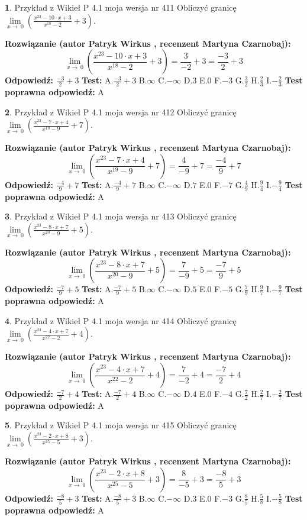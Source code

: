 \documentclass[12pt, a4paper]{article}
\theoremstyle{definition} %
\newtheorem{zad}{}
\newcommand{\zadStart}[1]{\begin{zad}#1\newline}
\newcommand{\zadStop}{\end{zad}}
\newcommand{\rozwStart}[2]{\noindent \textbf{Rozwiązanie (autor #1 , recenzent #2): }\newline}
\newcommand{\rozwStop}{\newline}
\newcommand{\odpStart}{\noindent \textbf{Odpowiedź:}\newline}
\newcommand{\odpStop}{\newline}
\newcommand{\testStart}{\noindent \textbf{Test:}\newline}
\newcommand{\testStop}{\newline}
\newcommand{\kluczStart}{\noindent \textbf{Test poprawna odpowiedź:}\newline}
\newcommand{\kluczStop}{\newline}
\begin{document}
\zadStart{Przykład z Wikieł P 4.1 moja wersja nr 411}
Obliczyć granicę $\lim\limits_{x\to\ 0}(\frac{x^{23}-10 \cdot x +3}{x^{18}-2}+3)$.
\zadStop
\rozwStart{Patryk Wirkus}{Martyna Czarnobaj}
$$\lim\limits_{x\to\ 0}(\frac{x^{23}-10 \cdot x +3}{x^{18}-2}+3)=\frac{3}{-2}+3=\frac{-3}{2}+3$$
\rozwStop
\odpStart
$\frac{-3}{2}+3$
\odpStop
\testStart
A.$\frac{-3}{2}+3$
B.$\infty$
C.$-\infty$
D.$3$
E.$0$
F.$-3$
G.$\frac{3}{2}$
H.$\frac{2}{3}$
I.$-\frac{2}{3}$
\testStop
\kluczStart
A
\kluczStop



\zadStart{Przykład z Wikieł P 4.1 moja wersja nr 412}
Obliczyć granicę $\lim\limits_{x\to\ 0}(\frac{x^{23}-7 \cdot x +4}{x^{19}-9}+7)$.
\zadStop
\rozwStart{Patryk Wirkus}{Martyna Czarnobaj}
$$\lim\limits_{x\to\ 0}(\frac{x^{23}-7 \cdot x +4}{x^{19}-9}+7)=\frac{4}{-9}+7=\frac{-4}{9}+7$$
\rozwStop
\odpStart
$\frac{-4}{9}+7$
\odpStop
\testStart
A.$\frac{-4}{9}+7$
B.$\infty$
C.$-\infty$
D.$7$
E.$0$
F.$-7$
G.$\frac{4}{9}$
H.$\frac{9}{4}$
I.$-\frac{9}{4}$
\testStop
\kluczStart
A
\kluczStop



\zadStart{Przykład z Wikieł P 4.1 moja wersja nr 413}
Obliczyć granicę $\lim\limits_{x\to\ 0}(\frac{x^{23}-8 \cdot x +7}{x^{20}-9}+5)$.
\zadStop
\rozwStart{Patryk Wirkus}{Martyna Czarnobaj}
$$\lim\limits_{x\to\ 0}(\frac{x^{23}-8 \cdot x +7}{x^{20}-9}+5)=\frac{7}{-9}+5=\frac{-7}{9}+5$$
\rozwStop
\odpStart
$\frac{-7}{9}+5$
\odpStop
\testStart
A.$\frac{-7}{9}+5$
B.$\infty$
C.$-\infty$
D.$5$
E.$0$
F.$-5$
G.$\frac{7}{9}$
H.$\frac{9}{7}$
I.$-\frac{9}{7}$
\testStop
\kluczStart
A
\kluczStop



\zadStart{Przykład z Wikieł P 4.1 moja wersja nr 414}
Obliczyć granicę $\lim\limits_{x\to\ 0}(\frac{x^{23}-4 \cdot x +7}{x^{22}-2}+4)$.
\zadStop
\rozwStart{Patryk Wirkus}{Martyna Czarnobaj}
$$\lim\limits_{x\to\ 0}(\frac{x^{23}-4 \cdot x +7}{x^{22}-2}+4)=\frac{7}{-2}+4=\frac{-7}{2}+4$$
\rozwStop
\odpStart
$\frac{-7}{2}+4$
\odpStop
\testStart
A.$\frac{-7}{2}+4$
B.$\infty$
C.$-\infty$
D.$4$
E.$0$
F.$-4$
G.$\frac{7}{2}$
H.$\frac{2}{7}$
I.$-\frac{2}{7}$
\testStop
\kluczStart
A
\kluczStop



\zadStart{Przykład z Wikieł P 4.1 moja wersja nr 415}
Obliczyć granicę $\lim\limits_{x\to\ 0}(\frac{x^{23}-2 \cdot x +8}{x^{25}-5}+3)$.
\zadStop
\rozwStart{Patryk Wirkus}{Martyna Czarnobaj}
$$\lim\limits_{x\to\ 0}(\frac{x^{23}-2 \cdot x +8}{x^{25}-5}+3)=\frac{8}{-5}+3=\frac{-8}{5}+3$$
\rozwStop
\odpStart
$\frac{-8}{5}+3$
\odpStop
\testStart
A.$\frac{-8}{5}+3$
B.$\infty$
C.$-\infty$
D.$3$
E.$0$
F.$-3$
G.$\frac{8}{5}$
H.$\frac{5}{8}$
I.$-\frac{5}{8}$
\testStop
\kluczStart
A
\kluczStop
\end{document}
